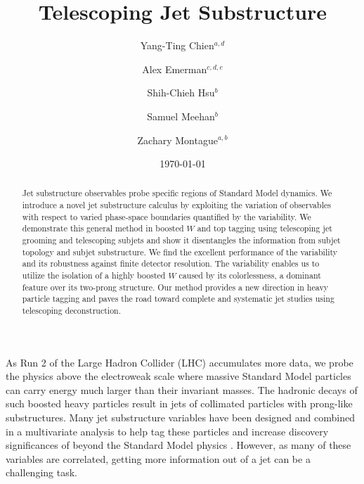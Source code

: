 \documentclass[aps,prl,floatfix,preprintnumbers,twocolumn,groupedaddress,nofootinbib]{revtex4-1}
\begin{document}
\title{Telescoping Jet Substructure}

\author{Yang-Ting Chien$^{a,d}$}

\author{Alex Emerman$^{c,d,e}$}

\author{Shih-Chieh Hsu$^b$}

\author{Samuel Meehan$^b$}

\author{Zachary Montague$^{a,b}$}


\date{\today}
\linenumbers

\begin{abstract}
Jet substructure observables probe specific regions of Standard Model dynamics. We introduce a novel jet substructure calculus by exploiting the variation of observables with respect to varied phase-space boundaries quantified by the variability. We demonstrate this general method in boosted $W$ and top tagging using telescoping jet grooming and telescoping subjets and show it disentangles the information from subjet topology and subjet substructure. We find the excellent performance of the variability and its robustness against finite detector resolution. The variability enables us to utilize the isolation of a highly boosted $W$ caused by its colorlessness, a dominant feature over its two-prong structure. Our method provides a new direction in heavy particle tagging and paves the road toward complete and systematic jet studies using telescoping deconstruction.
\end{abstract}
\maketitle

As Run 2 of the Large Hadron Collider (LHC) accumulates more data, we probe the physics above the electroweak scale where massive Standard Model particles can carry energy much larger than their invariant masses. The hadronic decays of such boosted heavy particles result in jets of collimated particles with prong-like substructures. Many jet substructure variables have been designed and combined in a multivariate analysis to help tag these particles and increase discovery significances of beyond the Standard Model physics \cite{Abdesselam:2010pt,Altheimer:2012mn,Altheimer:2013yza,Adams:2015hiv,Larkoski:2017jix}. However, as many of these variables are correlated, getting more information out of a jet can be a challenging task. %
\end{document}
